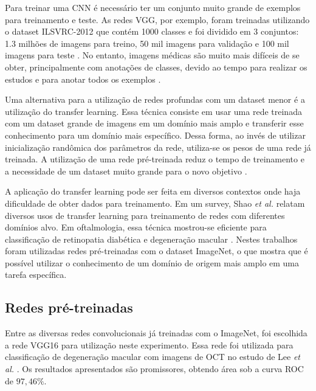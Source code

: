 \documentclass[conference]{IEEEtran}
\begin{document}

  Para treinar uma CNN é necessário ter um conjunto muito grande de exemplos para treinamento e teste. As redes VGG, por exemplo, foram treinadas utilizando o dataset ILSVRC-2012 \cite{ILSVRC15} que contém 1000 classes e foi dividido em 3 conjuntos: 1.3 milhões de imagens para treino, 50 mil imagens para validação e 100 mil imagens para teste \cite{simonyan2014}. No entanto, imagens médicas são muito mais difíceis de se obter, principalmente com anotações de classes, devido ao tempo para realizar os estudos e para anotar todos os exemplos \cite{greenspan2016}.
  
  Uma alternativa para a utilização de redes profundas com um dataset menor é a utilização do transfer learning. Essa técnica consiste em usar uma rede treinada com um dataset grande de imagens em um domínio mais amplo e transferir esse conhecimento para um domínio mais específico. Dessa forma, ao invés de utilizar inicialização randômica dos parâmetros da rede, utiliza-se os pesos de uma rede já treinada. A utilização de uma rede pré-treinada reduz o tempo de treinamento e a necessidade de um dataset muito grande para o novo objetivo \cite{tan2018}.

  A aplicação do transfer learning pode ser feita em diversos contextos onde haja dificuldade de obter dados para treinamento. Em um survey, Shao \textit{et al.} \cite{shao2015} relatam diversos usos de transfer learning para treinamento de redes com diferentes domínios alvo. Em oftalmologia, essa técnica mostrou-se eficiente para classificação de retinopatia diabética \cite{li2017} e degeneração macular \cite{lee2017}. Nestes trabalhos foram utilizadas redes pré-treinadas com o dataset ImageNet, o que mostra que é possível utilizar o conhecimento de um domínio de origem mais amplo em uma tarefa específica. 

  \subsection{Redes pré-treinadas}


  Entre as diversas redes convolucionais já treinadas com o ImageNet, foi escolhida a rede VGG16 para utilização neste experimento. Essa rede foi utilizada para classificação de degeneração macular com imagens de OCT no estudo de Lee \textit{et al.} \cite{lee2017}. Os resultados apresentados são promissores, obtendo área sob a curva ROC de $97,46\%$.
\end{document}

